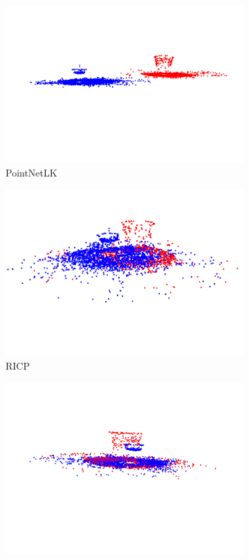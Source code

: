 \documentclass[12pt,titlepage, twoside]{article}
\begin{document}
\begin{figure}[htb]
\begin{subfigure}{0.19\textwidth}
  \includegraphics[width=\linewidth]{./Images/registration_pointnetlk_avocado.png}
  \caption{PointNetLK}
  \label{fig:registration:compare:3}
\end{subfigure}\hfil
\begin{subfigure}{0.19\textwidth}
    \includegraphics[width=\linewidth]{./Images/registration_ricp_avocado.png}
    \caption{RICP}
    \label{fig:registration:compare:4}
  \end{subfigure}\hfil
  \begin{subfigure}{0.19\textwidth}
      \includegraphics[width=\linewidth]{./Images/registration_rpm_avocado.png}

\end{subfigure}
\end{figure}
\end{document}
